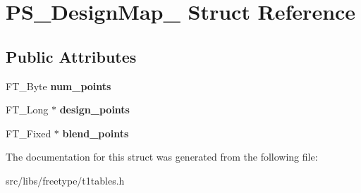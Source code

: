 \hypertarget{struct_p_s___design_map__}{
\section{PS\_\-DesignMap\_\- Struct Reference}
\label{struct_p_s___design_map__}
}
\subsection*{Public Attributes}
\begin{DoxyCompactItemize}
\item 
\hypertarget{struct_p_s___design_map___a505a70dd0f497f177fffca9bc4e5d0a5}{
FT\_\-Byte {\bfseries num\_\-points}}
\label{struct_p_s___design_map___a505a70dd0f497f177fffca9bc4e5d0a5}

\item 
\hypertarget{struct_p_s___design_map___abd7a86ba33248ceed657c31063b49679}{
FT\_\-Long $\ast$ {\bfseries design\_\-points}}
\label{struct_p_s___design_map___abd7a86ba33248ceed657c31063b49679}

\item 
\hypertarget{struct_p_s___design_map___a74a555fb4315fca7477f6d20d49686ec}{
FT\_\-Fixed $\ast$ {\bfseries blend\_\-points}}
\label{struct_p_s___design_map___a74a555fb4315fca7477f6d20d49686ec}

\end{DoxyCompactItemize}


The documentation for this struct was generated from the following file:\begin{DoxyCompactItemize}
\item 
src/libs/freetype/t1tables.h\end{DoxyCompactItemize}
